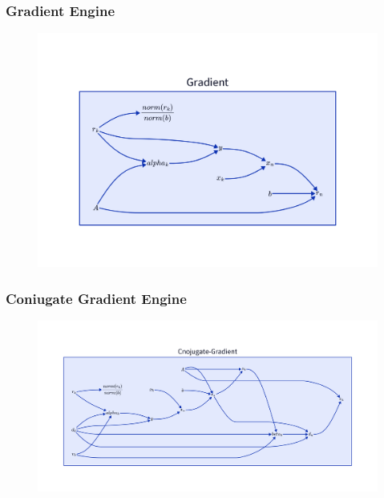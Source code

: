\documentclass{beamer}
\begin{document}
\begin{frame}
\frametitle{Gradient Engine}
\begin{figure}
  \centering
  \includegraphics[width=\linewidth]{images/cd-gre.png}
\end{figure}
\end{frame}

\begin{frame}
\frametitle{Coniugate Gradient Engine}
\begin{figure}
  \centering
  \includegraphics[width=\linewidth]{images/cd-cge.png}
\end{figure}
\end{frame}
\end{document}
